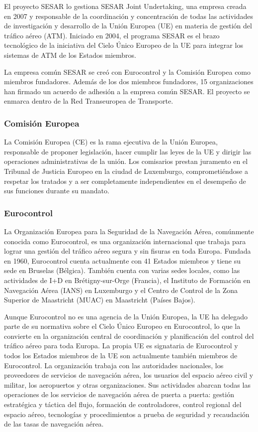 El proyecto SESAR lo gestiona SESAR Joint Undertaking, una empresa creada en 2007 y  responsable de la coordinación y concentración de todas las actividades de investigación y desarrollo de la Unión Europea (UE) en materia de gestión del tráfico aéreo (ATM). Iniciado en 2004, el programa SESAR es el brazo tecnológico de la iniciativa del Cielo Único Europeo de la UE para integrar los sistemas de ATM de los Estados miembros.

La empresa común SESAR se creó con Eurocontrol y la Comisión Europea como miembros fundadores. Además de los dos miembros fundadores, 15 organizaciones han firmado un acuerdo de adhesión a la empresa común SESAR. El proyecto se enmarca dentro de la Red Transeuropea de Transporte.

\subsubsection{Comisión Europea}

La Comisión Europea (CE) es la rama ejecutiva de la Unión Europea, responsable de proponer legislación, hacer cumplir las leyes de la UE y dirigir las operaciones administrativas de la unión. Los comisarios prestan juramento en el Tribunal de Justicia Europeo en la ciudad de Luxemburgo, comprometiéndose a respetar los tratados y a ser completamente independientes en el desempeño de sus funciones durante su mandato.

\subsubsection{Eurocontrol}

La Organización Europea para la Seguridad de la Navegación Aérea, comúnmente conocida como Eurocontrol, es una organización internacional que trabaja para lograr una gestión del tráfico aéreo segura y sin fisuras en toda Europa. Fundada en 1960, Eurocontrol cuenta actualmente con 41 Estados miembros y tiene su sede en Bruselas (Bélgica). También cuenta con varias sedes locales, como las actividades de I+D en Brétigny-sur-Orge (Francia), el Instituto de Formación en Navegación Aérea (IANS) en Luxemburgo y el Centro de Control de la Zona Superior de Maastricht (MUAC) en Maastricht (Países Bajos). 

Aunque Eurocontrol no es una agencia de la Unión Europea, la UE ha delegado parte de su normativa sobre el Cielo Único Europeo en Eurocontrol, lo que la convierte en la organización central de coordinación y planificación del control del tráfico aéreo para toda Europa. La propia UE es signataria de Eurocontrol y todos los Estados miembros de la UE son actualmente también miembros de Eurocontrol. La organización trabaja con las autoridades nacionales, los proveedores de servicios de navegación aérea, los usuarios del espacio aéreo civil y militar, los aeropuertos y otras organizaciones. Sus actividades abarcan todas las operaciones de los servicios de navegación aérea de puerta a puerta: gestión estratégica y táctica del flujo, formación de controladores, control regional del espacio aéreo, tecnologías y procedimientos a prueba de seguridad y recaudación de las tasas de navegación aérea.

